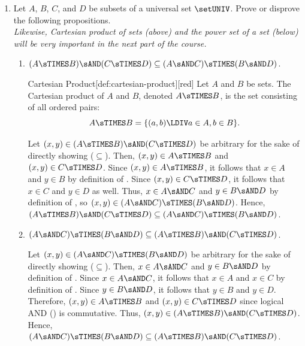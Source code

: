 \begin{enumerate}
  \newpage
  \item Let $A$, $B$, $C$, and $D$ be subsets of a universal set $\setUNIV$. 
  Prove or disprove the following propositions.\\
  \textit{Likewise, Cartesian product of sets (above) and the power set of a set (below) will be very important in the next part of the course.}
  \begin{enumerate}
    \item $(A \sTIMES B) \sAND(C \sTIMES D) \subseteq(A \sAND C) \sTIMES(B \sAND D)$.
    \begin{define}{Cartesian Product}[def:cartesian-product][red]
      Let $A$ and $B$ be sets. The Cartesian product of $A$ and $B$, denoted $A \sTIMES B$, is the set consisting of all ordered pairs:
      \[
      A \sTIMES B = \{(a, b) \LDIV a \in A, b \in B\}.
      \]
    \end{define}
    \begin{subprove}
      Let $(x,y) \in (A \sTIMES B) \sAND(C \sTIMES D)$ be arbitrary for the sake of directly showing ($\subseteq$). 
      Then, $(x,y) \in A \sTIMES B$ and $(x,y) \in C \sTIMES D$. 
      Since $(x,y) \in A \sTIMES B$, it follows that $x \in A$ 
      and $y \in B$ by definition of . Since $(x,y) \in C \sTIMES D$, it follows 
      that $x \in C$ and $y \in D$ as well.
      Thus, $x \in A \sAND C$ 
      and $y \in B \sAND D$ by definition of , 
      so $(x,y) \in (A \sAND C) \sTIMES(B \sAND D)$.
      Hence, $(A \sTIMES B) \sAND(C \sTIMES D) \subseteq(A \sAND C) \sTIMES(B \sAND D)$.
    \end{subprove}

    \item $(A \sAND C) \sTIMES(B \sAND D) \subseteq(A \sTIMES B) \sAND(C \sTIMES D)$.
    \begin{subprove}
      Let $(x,y) \in (A \sAND C) \sTIMES(B \sAND D)$ be arbitrary for the sake of directly showing ($\subseteq$). 
      Then, $x \in A \sAND C$ and $y \in B \sAND D$ by definition of . 
      Since $x \in A \sAND C$, it follows that $x \in A$ and $x \in C$ by definition of . 
      Since $y \in B \sAND D$, it follows that $y \in B$ and $y \in D$.
      Therefore, $(x,y) \in A \sTIMES B$ and $(x,y) \in C \sTIMES D$ since logical AND (\AND) is commutative.
      Thus, $(x,y) \in (A \sTIMES B) \sAND(C \sTIMES D)$.
      Hence, $(A \sAND C) \sTIMES(B \sAND D) \subseteq(A \sTIMES B) \sAND(C \sTIMES D)$.
    \end{subprove}


\end{enumerate}
\end{enumerate}
